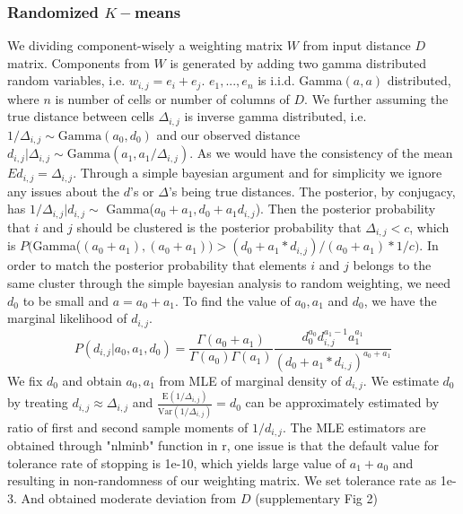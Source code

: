 \documentclass[aoas,preprint]{imsart}
\begin{document}
\subsubsection{Randomized $K-$means}
We dividing component-wisely a weighting matrix $W$ from input distance $D$ matrix.  Components from $W$ is generated by adding two gamma distributed random variables, i.e.  $w_{i,j} = e_i + e_j$. $e_1,...,e_n$ is i.i.d. Gamma$(a,a)$ distributed, where $n$ is number of cells or number of columns of $D$. We further assuming the true distance between cells $\Delta_{i,j}$ is inverse gamma distributed, i.e. $ 1 / \Delta_{i,j} \sim \text{Gamma}(a_0,d_0)$ and our observed distance $d_{i,j} | \Delta_{i,j} \sim \text{Gamma}(a_1, a_1 / \Delta_{i,j})$. As we would have the consistency of the mean $Ed_{i,j} = \Delta_{i,j}$. Through a simple bayesian argument and  for simplicity we ignore any issues about the $d$'s or $\Delta$'s being true distances. The posterior, by conjugacy, has $1 / \Delta_{i,j} | d_{i,j} \sim$ Gamma($a_0 + a_1, d_0 + a_1d_{i,j}$). Then the posterior probability that $i$ and $j$ should be clustered is the posterior probability that $\Delta_{i,j} < c$, which is $P($Gamma($(a_0 + a_1),(a_0 + a_1)) > (d_0 + a_1 * d_{i,j}) / (a_0 + a_1) * 1/c )$. In order to match the posterior probability that elements $i$ and $j$ belongs to the same cluster through the simple bayesian analysis to random weighting, we need $d_0$ to be small and $a = a_0 + a_1$. To find the value of $a_0, a_1$ and $d_0$, we have the marginal likelihood of $d_{i,j}$. 
$$P(d_{i,j} | a_0, a_1, d_0) = \frac{\Gamma(a_0 + a_1)}{\Gamma(a_0)\Gamma(a_1)} \frac{d_0^{a_0} d_{i,j}^{a_1 - 1}a_1^{a_1}}{(d_0 + a_1 * d_{i,j})^{a_0 + a_1}}$$
We fix $d_0$ and obtain $a_0, a_1$ from MLE of marginal density of $d_{i,j}$. We estimate $d_0$ by treating $d_{i,j} \approx \Delta_{i,j}$ and $\frac{\text{E}(1/\Delta_{i,j})}{\text{Var}(1/\Delta_{i,j})} = d_0$ can be approximately estimated by ratio of first and second sample moments of $1 / d_{i,j}$.
The MLE estimators are obtained through "nlminb" function in r, one issue is that the default value for tolerance rate of stopping is 1e-10, which yields large value of $a_1 + a_0$ and resulting in non-randomness of our weighting matrix. We set tolerance rate as 1e-3. And obtained moderate deviation from $D$ (supplementary Fig 2)
 
\end{document}
